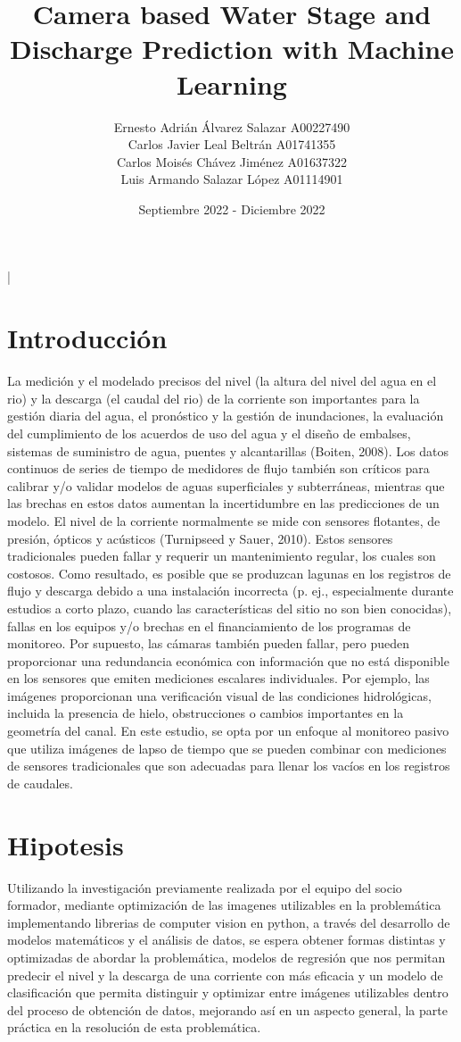 |\documentclass{article}
\title{Camera based Water Stage and Discharge Prediction with Machine Learning}
\author{
Ernesto Adrián Álvarez Salazar  A00227490\\
Carlos Javier Leal Beltrán  A01741355\\
Carlos Moisés Chávez Jiménez  A01637322\\
Luis Armando Salazar López  A01114901\\
}
\date{Septiembre 2022 - Diciembre 2022}
\begin{document}
\maketitle

\section{Introducción}

La medición y el modelado precisos del nivel (la altura del nivel del agua en el rio) y la descarga (el caudal del rio) de la corriente son importantes para la gestión diaria del agua, el pronóstico y la gestión de inundaciones, la evaluación del cumplimiento de los acuerdos de uso del agua y el diseño de embalses, sistemas de suministro de agua, puentes y alcantarillas (Boiten, 2008). Los datos continuos de series de tiempo de medidores de flujo también son críticos para calibrar y/o validar modelos de aguas superficiales y subterráneas, mientras que las brechas en estos datos aumentan la incertidumbre en las predicciones de un modelo.  El nivel de la corriente normalmente se mide con sensores flotantes, de presión, ópticos y acústicos (Turnipseed y Sauer, 2010).  Estos sensores tradicionales pueden fallar y requerir un mantenimiento regular, los cuales son costosos.  Como resultado, es posible que se produzcan lagunas en los registros de flujo y descarga debido a una instalación incorrecta (p. ej., especialmente durante estudios a corto plazo, cuando las características del sitio no son bien conocidas), fallas en los equipos y/o brechas en el financiamiento de los programas de monitoreo.  Por supuesto, las cámaras también pueden fallar, pero pueden proporcionar una redundancia económica con información que no está disponible en los sensores que emiten mediciones escalares individuales.  Por ejemplo, las imágenes proporcionan una verificación visual de las condiciones hidrológicas, incluida la presencia de hielo, obstrucciones o cambios importantes en la geometría del canal.  En este estudio, se opta por un enfoque al monitoreo pasivo que utiliza imágenes de lapso de tiempo que se pueden combinar con mediciones de sensores tradicionales que son adecuadas para llenar los vacíos en los registros de caudales.

\section{ Hipotesis}

Utilizando la investigación previamente realizada por el equipo del socio formador, mediante optimización de las imagenes utilizables en la problemática implementando librerias de computer vision en python, a través del desarrollo de modelos matemáticos y  el análisis de datos, se espera obtener formas distintas y optimizadas de abordar la problemática, modelos de regresión que nos permitan predecir el nivel y la descarga de una corriente con más eficacia y un modelo de clasificación que permita distinguir y optimizar entre imágenes utilizables dentro del proceso de obtención de datos, mejorando así en un aspecto general, la parte práctica en la resolución de esta problemática. 
\end{document}
